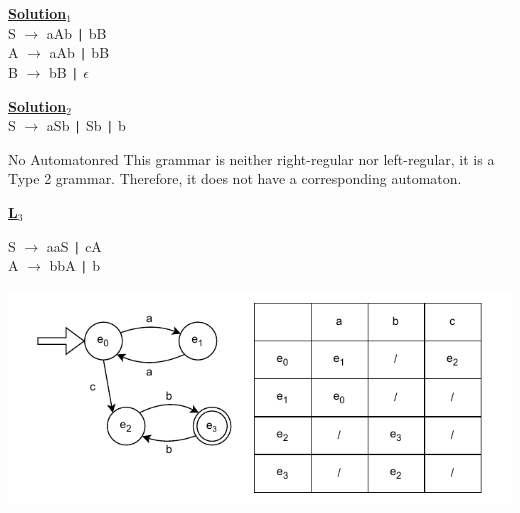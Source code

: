 \vspace{0.3cm}
\noindent
\begin{center}
\begin{minipage}{0.4\textwidth}
    \centering
    \textbf{\underline{Solution\(_1\)}}\\[0.2cm]
    S \(\to\) aAb \texttt{|} bB\\[0.1cm]
    A \(\to\) aAb \texttt{|} bB\\[0.1cm]
    \hspace{-0.6cm}    B \(\to\) bB \texttt{|} \(\epsilon\)\\[0.1cm]
\end{minipage}%
\hspace{1cm} %
\begin{minipage}{0.4\textwidth}
    \centering
    \textbf{\underline{Solution\(_2\)}}\\[0.2cm]
    S \(\to\) aSb \texttt{|} Sb \texttt{|} b\\[0.1cm]
\end{minipage}
\end{center}

\vspace{0.3cm}

\begin{prettyBox}{No Automaton}{red}
This grammar is neither right-regular nor left-regular, it is a Type 2 grammar.  
Therefore, it does not have a corresponding automaton.
\end{prettyBox}

\newpage
\textbf{\underline{L\(_3\)}}

    \vspace{0.3cm}

    \hspace{1.5cm}
\noindent
\begin{minipage}{0.4\textwidth}
    S \(\to\) aaS \texttt{|} cA \\[0.1cm]
    A \(\to\) bbA \texttt{|} b 
\end{minipage}%
\hspace{-1cm}
\begin{minipage}{0.5\textwidth}
    \centering
    \includegraphics[width=\textwidth]{Exercices/EX2/ex2.3.drawio.pdf}
\end{minipage}

